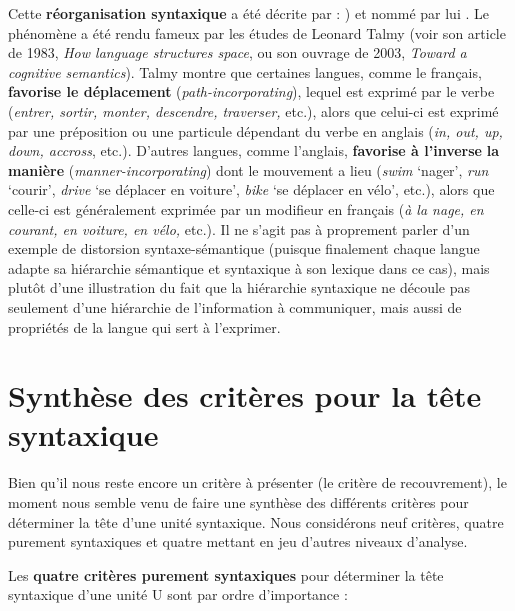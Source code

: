 {    Cette \textbf{réorganisation syntaxique} a été décrite par \citet{Tesnière1959} : ) et nommé par lui . Le phénomène a été rendu fameux par les études de Leonard Talmy (voir son article de 1983, \textit{How language structures space}, ou son ouvrage de 2003, \textit{Toward a cognitive semantics}). Talmy montre que certaines langues, comme le français, \textbf{favorise le déplacement} (\textit{path-incorporating}), lequel est exprimé par le verbe (\textit{entrer, sortir, monter, descendre, traverser,} etc.), alors que celui-ci est exprimé par une préposition ou une particule dépendant du verbe en anglais (\textit{in, out, up, down, accross}, etc.). D’autres langues, comme l’anglais, \textbf{favorise à l’inverse} \textbf{la manière} (\textit{manner-incorporating}) dont le mouvement a lieu (\textit{swim} ‘nager’, \textit{run} ‘courir’, \textit{drive} ‘se déplacer en voiture’, \textit{bike} ‘se déplacer en vélo’, etc.), alors que celle-ci est généralement exprimée par un modifieur en français (\textit{à la nage, en courant, en voiture, en vélo,} etc.). Il ne s’agit pas à proprement parler d’un exemple de distorsion syntaxe-sémantique (puisque finalement chaque langue adapte sa hiérarchie sémantique et syntaxique à son lexique dans ce cas), mais plutôt d’une illustration du fait que la hiérarchie syntaxique ne découle pas seulement d’une hiérarchie de l’information à communiquer, mais aussi de propriétés de la langue qui sert à l’exprimer.
}
\section{Synthèse des critères pour la tête syntaxique}\label{sec:3.3.20}

Bien qu’il nous reste encore un critère à présenter (le critère de recouvrement), le moment nous semble venu de faire une synthèse des différents critères pour déterminer la tête d’une unité syntaxique. Nous considérons neuf critères, quatre purement syntaxiques et quatre mettant en jeu d’autres niveaux d’analyse.

Les \textbf{quatre critères purement syntaxiques} pour déterminer la tête syntaxique d’une unité U sont par ordre d’importance :

